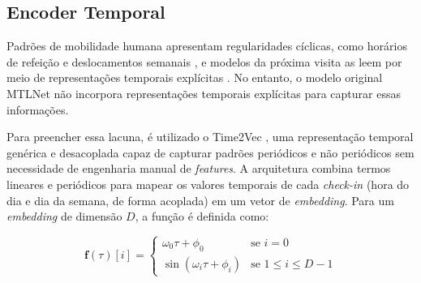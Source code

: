 \subsection{Encoder Temporal}

Padrões de mobilidade humana apresentam regularidades cíclicas, como horários de refeição e deslocamentos semanais \cite{cho2011friendship}, e modelos da próxima visita as leem por meio de representações temporais explícitas \cite{sun2020go}. No entanto, o modelo original MTLNet não incorpora representações temporais explícitas para capturar essas informações. 

Para preencher essa lacuna, é utilizado o Time2Vec \cite{kazemi2019time2vec}, uma representação temporal genérica e desacoplada capaz de capturar padrões periódicos e não periódicos sem necessidade de engenharia manual de \textit{features}. A arquitetura combina termos lineares e periódicos para mapear os valores temporais de cada \textit{check-in} (hora do dia e dia da semana, de forma acoplada) em um vetor de \textit{embedding}. Para um \textit{embedding} de dimensão $D$, a função é definida como:

\begin{equation}
\mathbf{f}(\tau)[i] = \begin{cases} \omega_0 \tau + \phi_0 & \text{se } i=0 \\ \sin(\omega_i \tau + \phi_i) & \text{se } 1 \leq i \leq D-1 \end{cases}
\label{eq:time2vec}
\end{equation}

